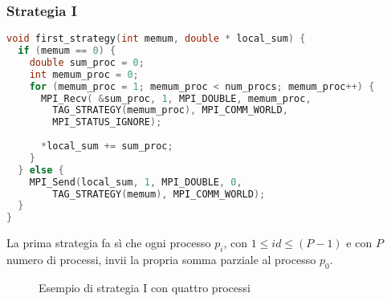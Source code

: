 \documentclass[a4paper,11pt]{book}
\begin{document}
\subsubsection{Strategia I}
\begin{lstlisting}[language=C]
void first_strategy(int memum, double * local_sum) {
  if (memum == 0) {
    double sum_proc = 0;
    int memum_proc = 0;
    for (memum_proc = 1; memum_proc < num_procs; memum_proc++) {
      MPI_Recv( &sum_proc, 1, MPI_DOUBLE, memum_proc,
        TAG_STRATEGY(memum_proc), MPI_COMM_WORLD,
        MPI_STATUS_IGNORE);
        
      *local_sum += sum_proc;
    }
  } else {
    MPI_Send(local_sum, 1, MPI_DOUBLE, 0,
        TAG_STRATEGY(memum), MPI_COMM_WORLD);
  }
}
\end{lstlisting}
La prima strategia fa sì che ogni processo $p_i$, con $1 \leq id \leq (P-1)$ e con $P$ numero di processi, invii la propria somma parziale al processo $p_0$.
\begin{figure}[H]
\centering
    \caption{Esempio di strategia I con quattro processi}
    \label{fig:Esempio di strategia I con quattro processi}
\end{figure}
\end{document}
